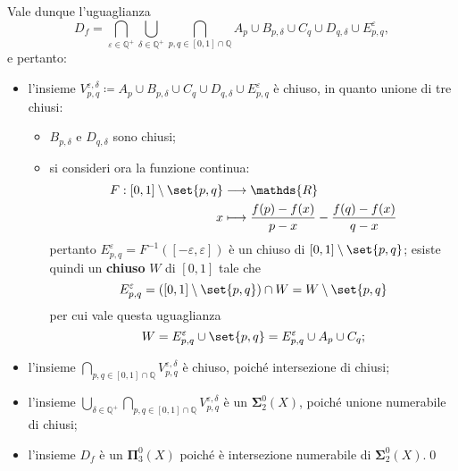 \documentclass{article}
\newcommand{\1}{\mathds{1}}
\newcommand{\R}{\mathds{R}}
\newcommand{\Q}{\mathds{Q}}
\begin{document}
Vale dunque l'uguaglianza
\begin{equation*}
D_{f} = \bigcap_{\varepsilon \in \Q^{+}} \bigcup_{\delta \in \Q^{ +}} \bigcap_{p,q \in [0,1]\cap \Q } A_{p}\cup B_{p,\delta}\cup C_{q}\cup D_{q,\delta}\cup E_{p,q}^{\varepsilon},
\end{equation*}
e pertanto:
\begin{itemize}
\item l'insieme \(V_{p,q}^{\varepsilon,\delta} \coloneqq A_{p}\cup B_{p,\delta}\cup C_{q}\cup D_{q,\delta}\cup E_{p,q}^{\varepsilon}\) è chiuso, in quanto unione di tre chiusi:
\begin{itemize}
\item \(B_{p,\delta}\) e \(D_{q,\delta}\) sono chiusi;
\item si consideri ora la funzione continua:
\begin{align*}
	F: [0,1]\setminus\set{p,q} &\longrightarrow \R\\
	x&\longmapsto \frac{f(p)-f(x)}{p-x}-\frac{f(q)-f(x)}{q-x}
\end{align*}
pertanto \(E_{p,q}^{\varepsilon} = F^{-1}\left([-\varepsilon,\varepsilon]\right)\) è un chiuso di \([0,1]\setminus\set{p,q}\); esiste quindi un \textbf{\textbf{chiuso}} \(W\) di \([0,1]\) tale che
\begin{equation*}
	E_{p,q}^{\varepsilon} = \left([0,1]\setminus\set{p,q}\right) \cap W = W\setminus\set{p,q}
\end{equation*}
per cui vale questa uguaglianza
\begin{equation*}
	W= E_{p,q}^{\varepsilon} \cup\set{p,q} = E_{p,q}^{\varepsilon} \cup A_{p}\cup C_{q};
\end{equation*}
\end{itemize}
\item l'insieme \(\bigcap_{p,q \in [0,1]\cap \Q} V_{p,q}^{\varepsilon,\delta}\) è chiuso, poiché intersezione di chiusi;
\item l'insieme \(\bigcup_{\delta \in \Q^{ +}} \bigcap_{p,q \in [0,1]\cap \Q } V_{p,q}^{\varepsilon,\delta}\) è un \(\bm{\Sigma}^0_2(X)\), poiché unione numerabile di chiusi;
\item l'insieme \(D_{f}\) è un \(\bm{\Pi}^0_3(X)\) poiché è intersezione numerabile di \(\bm{\Sigma}^0_2(X)\).\qed
\end{itemize}
\end{document}
